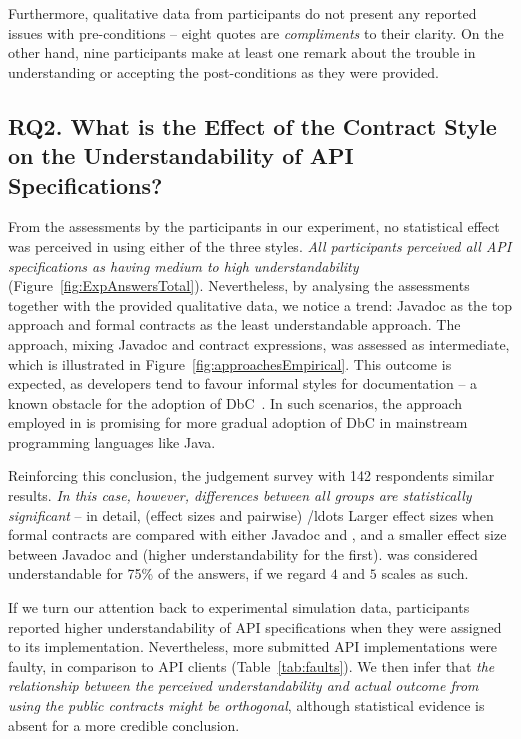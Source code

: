 Furthermore, qualitative data from participants do not present any reported issues with pre-conditions -- eight quotes are \emph{compliments} to their clarity. On the other hand, nine participants make at least one remark about the trouble in understanding or accepting the post-conditions as they were provided.


\subsection{RQ2. What is the Effect of the Contract Style on the Understandability of API Specifications?}
\label{rq2}

From the assessments by the participants in our experiment, no statistical effect was perceived in using either of the three styles. \emph{All participants perceived all API specifications as having medium to high understandability} (Figure~\ref{fig:ExpAnswersTotal}). 
Nevertheless, by analysing the assessments together with the provided qualitative data, we notice a trend: Javadoc as the top approach and formal contracts as the least understandable approach. The \contractjdoc{} approach, mixing Javadoc and contract expressions, was assessed as intermediate, which is illustrated in Figure~\ref{fig:approachesEmpirical}.
This outcome is expected, as developers tend to favour informal styles for documentation -- a known obstacle for the adoption of DbC~\cite{Polikarpova-etal09}. In such scenarios, the approach employed in \contractjdoc{} is promising for more gradual adoption of DbC in mainstream programming languages like Java.

Reinforcing this conclusion, the judgement survey with 142 respondents similar results. 
\emph{In this case, however, differences between all groups are statistically significant} -- in detail, (effect sizes and pairwise) /ldots
Larger effect sizes when formal contracts are compared with either Javadoc and \contractjdoc{}, and a smaller effect size between Javadoc and \contractjdoc{} (higher understandability for the first).
\contractjdoc{} was considered understandable for 75\% of the answers, if we regard $4$ and $5$ scales as such.

If we turn our attention back to experimental simulation data, participants reported higher understandability of API specifications when they were assigned to its implementation. Nevertheless, more submitted API implementations were faulty, in comparison to API clients (Table~\ref{tab:faults}). 
We then infer that \emph{the relationship between the perceived understandability and actual outcome from using the public contracts might be orthogonal}, although statistical evidence is absent for a more credible conclusion. 


